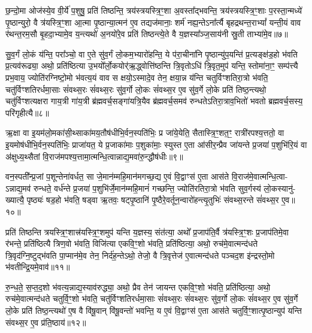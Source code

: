 छ॒न्दो॒मा ओज॑स्ये॒व वी॒र्ये॑ प॒शुषु॒ प्रति॑ तिष्ठन्ति॒ त्रय॑स्त्रयस्त्रि॒ꣳ॒शा अ॒वस्ता᳚द्भवन्ति॒ त्रय॑स्त्रयस्त्रि॒ꣳ॒शाः प॒रस्ता॒न्मध्ये॑ पृ॒ष्ठान्युरो॒ वै त्र॑यस्त्रि॒ꣳ॒शा आ॒त्मा पृ॒ष्ठान्या॒त्मन॑ ए॒व तद्यज॑मानाः॒ शर्म॑ नह्य॒न्ते\-ऽना᳚र्त्यै बृहद्रथन्त॒रा\-भ्यां᳚ यन्ती॒यं वाव र॑थन्त॒रम॒सौ बृ॒हदा॒भ्यामे॒व य॒न्त्यथो॑ अ॒नयो॑रे॒व प्रति॑ तिष्ठन्त्ये॒ते वै य॒ज्ञस्या᳚ञ्ज॒साय॑नी स्रु॒ती ताभ्या॑मे॒व॥७॥

सु॒व॒र्गं लो॒कं य॑न्ति॒ परा᳚ञ्चो॒ वा ए॒ते सु॑व॒र्गं लो॒कम॒भ्यारो॑हन्ति॒ ये प॑रा॒चीना॑नि पृ॒ष्ठान्यु॑प॒यन्ति॑ प्र॒त्यङ्क्ष॑ड॒हो भ॑वति प्र॒त्यव॑रूढ्या॒ अथो॒ प्रति॑ष्ठित्या उ॒भयो᳚र्लो॒कयोर्\mbox{}॑ऋ॒द्ध्वोत्ति॑ष्ठन्ति त्रि॒वृतो\-ऽधि॑ त्रि॒वृत॒मुप॑ यन्ति॒ स्तोमा॑ना॒ꣳ॒ सम्प॑त्त्यै प्रभ॒वाय॒ ज्योति॑रग्निष्टो॒मो भ॑वत्य॒यं वाव स क्षयो॒\-ऽस्मादे॒व तेन॒ क्षया॒न्न य॑न्ति चतुर्विꣳशतिरा॒त्रो भ॑वति॒ चतु॑र्विꣳशतिरर्धमा॒साः सं॑वथ्स॒रः सं॑वथ्स॒रः सु॑व॒र्गो लो॒कः सं॑वथ्स॒र ए॒व सु॑व॒र्गे लो॒के प्रति॑ तिष्ठ॒न्त्यथो॒ चतु॑र्विꣳशत्यक्षरा गाय॒त्री गा॑य॒त्री ब्र॑ह्मवर्च॒सङ्गा॑यत्रि॒यैव ब्र॑ह्मवर्च॒समव॑ रुन्धते\-ऽतिरा॒त्राव॒भितो॑ भवतो ब्रह्मवर्च॒सस्य॒ परि॑गृहीत्यै॥८॥

{\anuvakamend[{म॒नु॒ष्य॑स्य मध्य॒तः प॒शव॒स्ताभ्या॑मे॒व सं॑ वथ्स॒रश्चतु॑र्विꣳशतिश्च॥२॥}]}

ऋ॒क्षा वा इ॒यम॑लो॒मका॑सी॒थ्साका॑मय॒तौष॑धीभि॒र्वन॒स्पति॑भिः॒ प्र जा॑ये॒येति॒ सैतास्त्रि॒ꣳ॒शत॒ꣳ॒ रात्री॑रपश्य॒त्ततो॒ वा इ॒यमोष॑धीभि॒र्वन॒स्पति॑भिः॒ प्राजा॑यत॒ ये प्र॒जाका॑माः प॒शुका॑माः॒ स्युस्त ए॒ता आ॑सीर॒न्प्रैव जा॑यन्ते प्र॒जया॑ प॒शुभि॑रि॒यं वा अ॑क्षुध्य॒थ्सैतां वि॒राज॑मपश्य॒त्तामा॒त्मन्धि॒त्वान्नाद्य॒मवा॑रु॒न्द्धौष॑धीः॥९॥

वन॒स्पती᳚न्प्र॒जां प॒शून्तेना॑वर्धत॒ सा जे॒मान॑म्महि॒मान॑मगच्छ॒द्य ए॒वं वि॒द्वाꣳस॑ ए॒ता आस॑ते वि॒राज॑मे॒वात्मन्धि॒त्वा- \-ऽन्नाद्य॒मव॑ रुन्धते॒ वर्ध॑न्ते प्र॒जया॑ प॒शुभि॑र्जे॒मान॑म्महि॒मानं॑ गच्छन्ति॒ ज्योति॑रतिरा॒त्रो भ॑वति सुव॒र्गस्य॑ लो॒कस्यानु॑- ख्यात्यै॒ पृष्ठ्यः॑ षड॒हो भ॑वति॒ षड्वा ऋ॒तवः॒ षट्पृ॒ष्ठानि॑ पृ॒ष्ठैरे॒वर्तून॒न्वारो॑हन्त्यृ॒तुभिः॑ संवथ्स॒रन्ते सं॑वथ्स॒र ए॒व॥१०॥

प्रति॑ तिष्ठन्ति त्रयस्त्रि॒ꣳ॒शात्त्र॑यस्त्रि॒ꣳ॒शमुप॑ यन्ति य॒ज्ञस्य॒ संत॑त्या॒ अथो᳚ प्र॒जाप॑ति॒र्वै त्र॑यस्त्रि॒ꣳ॒शः प्र॒जाप॑तिमे॒वा र॑भन्ते॒ प्रति॑ष्ठित्यै त्रिण॒वो भ॑वति॒ विजि॑त्या एकवि॒ꣳ॒शो भ॑वति॒ प्रति॑ष्ठित्या॒ अथो॒ रुच॑मे॒वात्मन्द॑धते त्रि॒वृद॑ग्नि॒ष्टुद्भ॑वति पा॒प्मान॑मे॒व तेन॒ निर्द॑ह॒न्ते\-ऽथो॒ तेजो॒ वै त्रि॒वृत्तेज॑ ए॒वात्मन्द॑धते पञ्चद॒श इ॑न्द्रस्तो॒मो भ॑वतीन्द्रि॒यमे॒वाव॑॥११॥

रु॒न्ध॒ते॒ स॒प्त॒द॒शो भ॑वत्य॒न्नाद्य॒स्याव॑रुद्ध्या॒ अथो॒ प्रैव तेन॑ जायन्त एकवि॒ꣳ॒शो भ॑वति॒ प्रति॑ष्ठित्या॒ अथो॒ रुच॑मे॒वात्मन्द॑धते चतुर्वि॒ꣳ॒शो भ॑वति॒ चतु॑र्विꣳशतिरर्धमा॒साः सं॑वथ्स॒रः सं॑वथ्स॒रः सु॑व॒र्गो लो॒कः सं॑वथ्स॒र ए॒व सु॑व॒र्गे लो॒के प्रति॑ तिष्ठ॒न्त्यथो॑ ए॒ष वै वि॑षू॒वान् वि॑षू॒वन्तो॑ भवन्ति॒ य ए॒वं वि॒द्वाꣳस॑ ए॒ता आस॑ते चतुर्वि॒ꣳ॒शात्पृ॒ष्ठान्युप॑ यन्ति संवथ्स॒र ए॒व प्र॑ति॒ष्ठाय॑॥१२॥


